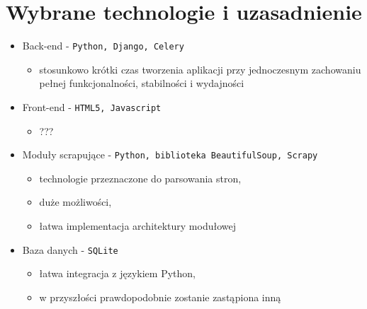 \documentclass[12pt, titlepage]{article}
\begin{document}
	\section{Wybrane technologie i uzasadnienie}
	\begin{itemize}
		\item Back-end - \texttt{Python, Django, Celery}
		\begin{itemize}
			\item stosunkowo krótki czas tworzenia aplikacji przy jednoczesnym zachowaniu pełnej funkcjonalności, stabilności i wydajności
		\end{itemize}
		\item Front-end - \texttt{HTML5, Javascript}
		\begin{itemize}
			\item ???
		\end{itemize}
		\item Moduły scrapujące - \texttt{Python, biblioteka BeautifulSoup, Scrapy}
		\begin{itemize}
			\item technologie przeznaczone do parsowania stron,
			\item duże możliwości,
			\item łatwa implementacja architektury modułowej
		\end{itemize}
		\item Baza danych - \texttt{SQLite}
		\begin{itemize}
			\item łatwa integracja z językiem Python,
			\item w przyszłości prawdopodobnie zostanie zastąpiona inną
		\end{itemize}
	\end{itemize}
\end{document}
